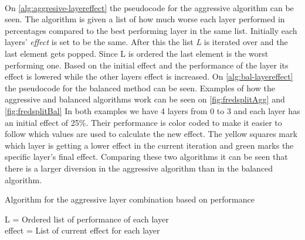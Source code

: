 \\
On \autoref{alg:aggresive-layereffect} the pseudocode for the aggressive algorithm can be seen.
The algorithm is given a list of how much worse each layer performed in percentages compared to the best performing layer in the same list.
Initially each layers' \textit{effect} is set to be the same.
After this the list \textit{L} is iterated over and the last element gets popped.
Since L is ordered the last element is the worst performing one.
Based on the initial effect and the performance of the layer its effect is lowered while the other layers effect is increased.
On \autoref{alg:bal-layereffect} the pseudocode for the balanced method can be seen.
Examples of how the aggressive and balanced algorithms work can be seen on \autoref{fig:fredsplitAgg} and \autoref{fig:fredsplitBal}
In both examples we have 4 layers from 0 to 3 and each layer has an initial effect of 25\%.
Their performance is color coded to make it easier to follow which values are used to calculate the new effect.
The yellow squares mark which layer is getting a lower effect in the current iteration and green marks the specific layer's final effect.
Comparing these two algorithms it can be seen that there is a larger diversion in the aggressive algorithm than in the balanced algorithm.
\begin{algorithm}
    \caption{Algorithm for the aggressive layer combination based on performance}
    \SetAlgoLined
    L = Ordered list of performance of each layer \\
    effect  = List of current effect for each layer \\
    \label{alg:aggresive-layereffect}
\end{algorithm}

